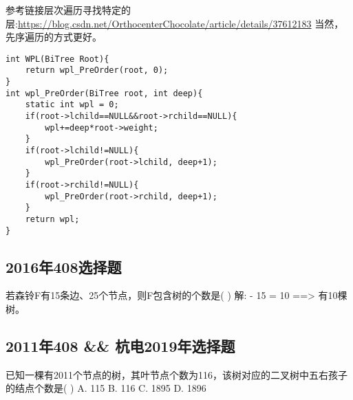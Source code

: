 参考链接层次遍历寻找特定的层:\url{https://blog.csdn.net/OrthocenterChocolate/article/details/37612183}\newline
当然，先序遍历的方式更好。\newline
\begin{lstlisting}[basicstyle=\small\ttfamily, caption={}, numbers=none]
int WPL(BiTree Root){
	return wpl_PreOrder(root, 0);
}
int wpl_PreOrder(BiTree root, int deep){
	static int wpl = 0;
	if(root->lchild==NULL&&root->rchild==NULL){
		wpl+=deep*root->weight;
	}
	if(root->lchild!=NULL){
		wpl_PreOrder(root->lchild, deep+1);
	}
	if(root->rchild!=NULL){
		wpl_PreOrder(root->rchild, deep+1);
	}
	return wpl;
}
\end{lstlisting}

\subsection{2016年408选择题}
若森铃F有15条边、25个节点，则F包含树的个数是(  ) \newline
解: - 15 = 10 ==> 有10棵树。

\subsection{2011年408 \&\&  杭电2019年选择题}
已知一棵有2011个节点的树，其叶节点个数为116，该树对应的二叉树中五右孩子的结点个数是(   )\newline
A. 115  B. 116  C. 1895  D. 1896\newline














